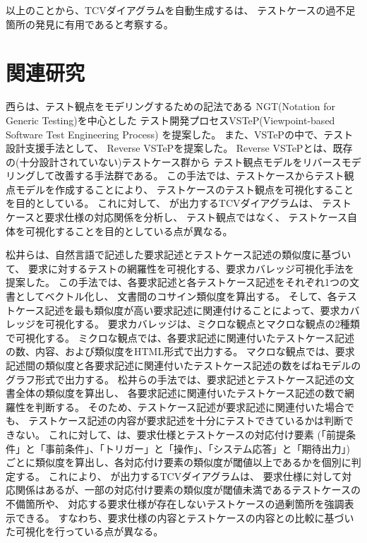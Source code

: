 以上のことから、TCVダイアグラムを自動生成する\tool{}は、
テストケースの過不足箇所の発見に有用であると考察する。

\section{関連研究}\label{sec:related_work}
西らは、テスト観点をモデリングするための記法である
NGT(Notation for Generic Testing)を中心とした
テスト開発プロセスVSTeP(Viewpoint-based Software Test Engineering Process)
を提案した\cite{vstep1}\cite{vstep2}。
また、VSTePの中で、テスト設計支援手法として、
Reverse VSTePを提案した\cite{re-vstep}。
Reverse VSTePとは、既存の(十分設計されていない)テストケース群から
テスト観点モデルをリバースモデリングして改善する手法群である。
この手法では、テストケースからテスト観点モデルを作成することにより、
テストケースのテスト観点を可視化することを目的としている。
これに対して、\tool{} が出力するTCVダイアグラムは、
テストケースと要求仕様の対応関係を分析し、
テスト観点ではなく、
テストケース自体を可視化することを目的としている点が異なる。

松井らは、自然言語で記述した要求記述とテストケース記述の類似度に基づいて、
要求に対するテストの網羅性を可視化する、要求カバレッジ可視化手法を提案した\cite{matsui2018}。
この手法では、各要求記述と各テストケース記述をそれぞれ1つの文書としてベクトル化し、
文書間のコサイン類似度を算出する。
そして、各テストケース記述を最も類似度が高い要求記述に関連付けることによって、要求カバレッジを可視化する。
要求カバレッジは、ミクロな観点とマクロな観点の2種類で可視化する。
ミクロな観点では、各要求記述に関連付いたテストケース記述の数、内容、および類似度をHTML形式で出力する。
マクロな観点では、要求記述間の類似度と各要求記述に関連付いたテストケース記述の数をばねモデルのグラフ形式で出力する。
松井らの手法では、要求記述とテストケース記述の文書全体の類似度を算出し、
各要求記述に関連付いたテストケース記述の数で網羅性を判断する。
そのため、テストケース記述が要求記述に関連付いた場合でも、
テストケース記述の内容が要求記述を十分にテストできているかは判断できない。
これに対して、\tool{}は、要求仕様とテストケースの対応付け要素
(「前提条件」と「事前条件」、「トリガー」と「操作」、「システム応答」と「期待出力」)
ごとに類似度を算出し、各対応付け要素の類似度が閾値以上であるかを個別に判定する。
これにより、\tool{} が出力するTCVダイアグラムは、
要求仕様に対して対応関係はあるが、一部の対応付け要素の類似度が閾値未満であるテストケースの不備箇所や、
対応する要求仕様が存在しないテストケースの過剰箇所を強調表示できる。
すなわち、要求仕様の内容とテストケースの内容との比較に基づいた可視化を行っている点が異なる。

